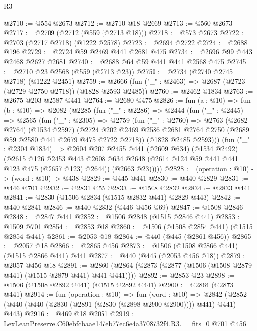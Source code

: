 \begin{lexlean}{R3}
\begin{coremodule}
@2710 := @554 @2673
@2712 := @2710 @18 @2669
@2713 := @560 @2673
@2717 := @2709 (@2712 (@559 (@2713 @18)))
@2718 := @573 @2673
@2722 := @2703 (@2717 @2718) (@1222 @2578)
@2723 := @2694 @2722
@2724 := @2688 @196
@2729 := @2724 @59 @2469 @441 @2681 @475
@2734 := @2696 @99 @443 @2468 @2627 @2681
@2740 := @2688 @64 @59 @441 @441 @2568 @475
@2745 := @2710 @23 @2568 (@559 (@2713 @23))
@2750 := @2734 (@2740 @2745 @2718) (@1222 @2451)
@2759 := @2666 (fun ("_" : @2463) => @2687 (@2723 (@2729 @2750 @2718)) (@1828 @2593 @2485))
@2760 := @2462 @1834
@2763 := @2675 @203 @2587 @441
@2764 := @2680 @475
@2826 := fun (a : @10) =>
  fun (b : @10) =>
  @2082
    (@2285
      (fun ("_" : @2286) =>
      @2444
        (fun ("_" : @2445) =>
        @2565
          (fun ("_" : @2305) =>
          @2759
            (fun ("_" : @2760) =>
            @2763
              (@2682 @2764)
              (@1534 @2597)
              (@2724
                @202
                @2469
                @2586
                @2681
                @2764
                @2750
                (@2689 @59 @2580 @441 @2679 @475 @2722 @2718))
              (@1828 @2485 @2593)))
          (fun ("_" : @2304 @1834) =>
          @2604
            @207
            @2455
            @441
            (@2609 @634)
            (@1534 @2492)
            (@2615
              @126
              @2453
              @443
              @2608
              @634
              @2648
              (@2614 @124 @59 @441 @441 @123 @475 (@2657 @123) @2644))
            (@2663 @23)))))
@2828 := (operation : @10) -> (word : @10) -> @438
@2829 := @445 @441
@2830 := @440 @2829
@2831 := @446 @701
@2832 := @2831 @55
@2833 := @1508 @2832
@2834 := @2833 @441
@2841 := @2830 (@1506 @2834 (@1515 @2832 @441) @2829 @443)
@2842 := @440 @2841
@2846 := @440 @2832 (@446 @456 @69)
@2847 := @1508 @2846
@2848 := @2847 @441
@2852 := @1506 @2848 (@1515 @2846 @441)
@2853 := @1509 @701
@2854 := @2853 @18
@2860 := @1506 (@1508 @2854 @441) (@1515 @2854 @441)
@2861 := @2053 @18
@2864 := @440 (@445 (@2861 @456))
@2865 := @2057 @18
@2866 := @2865 @456
@2873 := @1506 (@1508 @2866 @441) (@1515 @2866 @441) @441
@2877 := @440 (@445 (@2053 @456 @18))
@2879 := @2057 @456 @18
@2891 := @2860 (@2864 (@2873 (@2877 (@1506 (@1508 @2879 @441) (@1515 @2879 @441) @441 @441))))
@2892 := @2853 @23
@2898 := @1506 (@1508 @2892 @441) (@1515 @2892 @441)
@2900 := @2864 (@2873 @441)
@2914 := fun (operation : @10) =>
  fun (word : @10) =>
  @2842 (@2852 (@440 (@440 (@2830 (@2891 (@2830 (@2898 @2900 @2900)))) @441) @441) @443)
@2916 := @469 @18 @2051
@2919 := LexLeanPreserve.C60ebfcbaae147eb77ec6e4a3708732f4.R3.__fits_0 @701 @456

\end{coremodule}
\end{lexlean}
